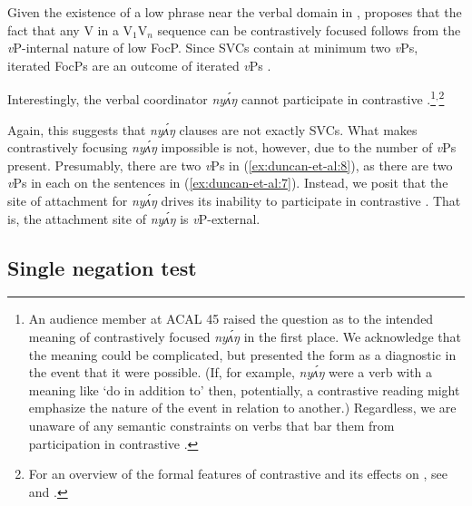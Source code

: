 \documentclass[output=paper,modfonts,nonflat,
]{langsci/langscibook}
\begin{document}
\noindent Given the existence of a low  phrase near the verbal domain in  \citep{duncan-toappear}, \citet{duncan2016parallel} proposes that the fact that any V in a V$_1$V$_n$ sequence can be contrastively focused follows from the \textit{v}P-internal nature of low FocP. Since SVCs contain at minimum two \textit{v}Ps, iterated FocPs are an outcome of iterated \textit{v}Ps \citep[98-100]{duncan2016parallel}. 

Interestingly, the verbal coordinator \textit{ny\'{ʌ}ŋ} cannot participate in contrastive .\footnote{An audience member at ACAL 45 raised the question as to the intended meaning of contrastively focused \textit{ny\'{ʌ}ŋ} in the first place. We acknowledge that the meaning could be complicated, but presented the form as a diagnostic in the event that it were possible. (If, for example, \textit{ny\'{ʌ}ŋ} were a verb with a meaning like `do in addition to' then, potentially, a contrastive  reading might emphasize the nature of the event in relation to another.) Regardless, we are unaware of any semantic constraints on verbs that bar them from participation in contrastive .}$^,$\footnote{For an overview of the formal features of  contrastive  and its effects on , see \citet{akinlabi2003} and \citet{duncan-toappear}.}


 \label{ex:duncan-et-al:8}
\z

\noindent Again, this suggests that \textit{ny\'{ʌ}ŋ} clauses are not exactly SVCs. What makes contrastively focusing \textit{ny\'{ʌ}ŋ} impossible is not, however, due to the number of \textit{v}Ps present. Presumably, there are two \textit{v}Ps in (\ref{ex:duncan-et-al:8}), as there are two \textit{v}Ps in each on the sentences in (\ref{ex:duncan-et-al:7}). Instead, we posit that the site of attachment for \textit{ny\'{ʌ}ŋ} drives its inability to participate in contrastive . That is, the attachment site of \textit{ny\'{ʌ}ŋ} is \textit{v}P-external.

\subsection{Single negation test}\label{sec:duncan-et-al:2.3}
\end{document}
